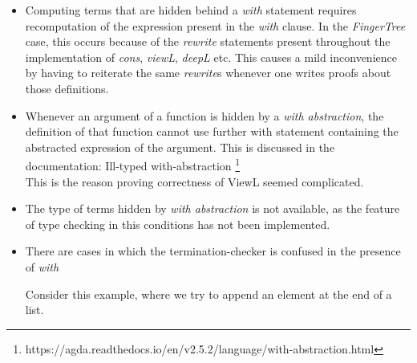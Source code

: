 \documentclass[12pt,twoside,notitlepage]{report}
\newcommand{\Conid}[1]{\mathit{#1}}
\newcommand{\Varid}[1]{\mathit{#1}}
\def\resethooks{%
  \global\let\SaveRestoreHook\empty
  \global\let\ColumnHook\empty}
\let\hspre\empty
\let\hspost\empty
\begin{document}
\begin{itemize}
\item Computing terms that are hidden behind a \textit{with} statement requires recomputation of the expression present in the \textit{with} clause. In the \textit{FingerTree} case, this occurs because of the \textit{rewrite} statements present throughout the implementation of \textit{cons}, \textit{viewL}, \textit{deepL} etc. This causes a mild inconvenience by having to reiterate the same \textit{rewrite}s whenever one writes proofs about those definitions.

\item Whenever an argument of a function is hidden by a \textit{with abstraction}, the definition of that function cannot use further with statement containing the abstracted expression of the argument. This is discussed in the documentation: Ill-typed with-abstraction \footnote{https://agda.readthedocs.io/en/v2.5.2/language/with-abstraction.html} \\
This is the reason proving correctness of ViewL seemed complicated.

\item The type of terms hidden by \textit{with abstraction} is not available, as the feature of type checking in this conditions has not been implemented.

\item There are cases in which the termination-checker is confused in the presence of \textit{with}

Consider this example, where we try to append an element at the end of a list.

\resethooks

\end{itemize}
\end{document}
